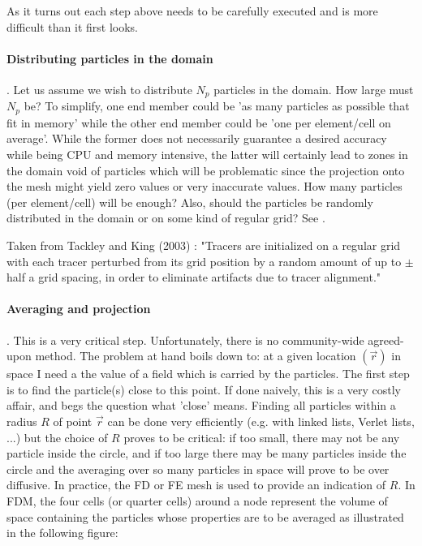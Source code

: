 As it turns out each step above needs to be carefully executed and is more difficult than it 
first looks. 

\paragraph{Distributing particles in the domain}. Let us assume we wish to distribute $N_p$ particles
in the domain. How large must $N_p$ be? To simplify, one end member could be 'as many particles as possible that fit in memory' 
while the other end member could be 'one per element/cell on average'. While the former does not necessarily guarantee a 
desired accuracy while being CPU and memory intensive, the latter will certainly lead to zones in the domain void 
of particles which will be problematic since the projection onto the mesh might yield zero values or very inaccurate values.
How many particles (per element/cell) will be enough?
Also, should the particles be randomly distributed in the domain or on some kind of regular grid? 
See .

Taken from Tackley and King (2003) \cite{taki03}: "Tracers are initialized on a regular grid 
with each tracer perturbed from its grid position by a random amount of up to
$\pm$ half a grid spacing, in order to eliminate artifacts due to tracer alignment."


\paragraph{Averaging and projection}. This is a very critical step. Unfortunately, there is no community-wide
agreed-upon method. The problem at hand boils down to: at a given location $(\vec r)$ in space I need a
the value of a field which is carried by the particles. 
The first step is to find the particle(s) close to this point. If done naively, this is a very costly affair, 
and begs the question what 'close' means. Finding all particles within a radius $R$ of point $\vec r$ can 
be done very efficiently (e.g. with linked lists, Verlet lists, ...) but the choice 
of $R$ proves to be critical:
if too small, there may not be any particle inside the circle, and if too large there may be many particles 
inside the circle and the averaging over so many particles in space will prove to be over diffusive. 
In practice, the FD or FE mesh is used to provide an indication of $R$. 
In FDM, the four cells (or quarter cells) around
a node represent the volume of space containing the particles whose properties are to be averaged \cite{dumg11} 
as illustrated in the following figure:

